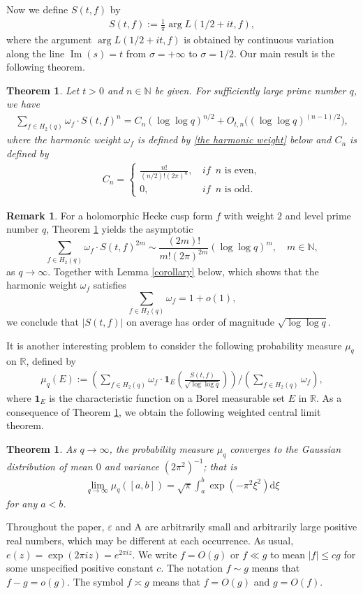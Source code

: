 \documentclass[11pt,reqno]{amsart}
\newcommand{\bna}{\begin{eqnarray*}}
\newcommand{\ena}{\end{eqnarray*}}
\numberwithin{equation}{section}
\theoremstyle{plain}
\newtheorem{theorem}[lemma]{Theorem}
\theoremstyle{definition}
\newtheorem{remark}{Remark}
\renewcommand{\Im}{\operatorname{Im}}
\begin{document}
Now we define $S(t,f)$ by
\bna
S(t,f):=\frac{1}{\pi}\arg L(1/2+it, f),
\ena
where the argument $\arg L(1/2+it, f)$ is obtained by continuous variation along the line $\Im(s)=t$ from
$\sigma=+\infty$ to $\sigma=1/2$.
Our main result is the following theorem.
\begin{theorem}\label{main-theorem}
Let $t>0$ and $n\in \mathbb{N}$ be given.
For sufficiently large prime number $q$, we have
\begin{equation*}
\begin{split}
\sum_{f\in H_2(q)}\omega_f\cdot S(t,f)^n=
C_n(\log\log q)^{n/2}+O_{t,n}\big((\log\log q)^{(n-1)/2}\big),
\end{split}
\end{equation*}
where the harmonic weight $\omega_f$ is defined by \eqref{the harmonic weight} below and $C_n$ is defined by
\bna
C_n=\begin{cases}
\frac{n!}{(n/2)!(2\pi)^{n}}, \,&\textit{if }\, n\,\, \text{is even},\\
0, \,& \textit{if }\, n \,\,\text{is odd}.
\end{cases}
\ena
\end{theorem}
\begin{remark}
For a holomorphic Hecke cusp form $f$ with weight $2$ and level prime number $q$,
Theorem \ref{main-theorem} yields the asymptotic
\[
\sum_{f \in H_2(q)}\omega_f\cdot S(t,f)^{2m} \sim \frac{(2m)!}{m!(2\pi)^{2m}} (\log\log q)^m, \quad m\in \mathbb{N},
\]
as $q\rightarrow\infty$. Together with Lemma \ref{corollary} below, which shows that
the harmonic weight $\omega_f$ satisfies
\[\sum_{f \in H_2(q)} \omega_f =1+o(1),\]
we conclude that $|S(t,f)|$ on average has order of magnitude $\sqrt{\log\log q}$.
\end{remark}
It is another interesting problem to consider the following probability measure
$\mu_q$ on $\mathbb{R}$, defined by
\bna
\mu_q(E):=\left(\sum_{f\in H_2(q)}\omega_f\cdot
\textbf{1}_E\left(\frac{S(t,f)}{\sqrt{\log\log q}}\right)\right)\bigg/
\left(\sum_{f\in H_2(q)}\omega_f\right),
\ena
where $\textbf{1}_E$ is the characteristic function on a Borel measurable set $E$ in $\mathbb{R}$.
As a consequence of Theorem \ref{main-theorem}, we obtain the following weighted central limit theorem.
\begin{theorem}\label{main-corollary}
As $q\rightarrow \infty$, the probability measure $\mu_q$ converges to the Gaussian distribution of mean $0$
and variance $(2\pi^2)^{-1}$; that is
\bna
\lim_{q\rightarrow \infty} \mu_q([a,b])=\sqrt{\pi}\int_a^b \exp(-\pi^2\xi^2)\mathrm{d}\xi
\ena
for any $a<b$.
\end{theorem}
 Throughout the paper,
$\varepsilon$ and A are arbitrarily small and arbitrarily large positive
real numbers, which may be different at each occurrence.
As usual, $e(z) = \exp (2 \pi i z) = e^{2 \pi i z}$.
We write $f = O(g)$ or $f \ll g$ to mean $|f| \leq cg$ for some unspecified positive constant $c$.
The notation $f\sim g$ means that $f-g=o(g)$.
The symbol $f \asymp g$ means that $f=O(g)$ and $g=O(f)$.
\end{document}

